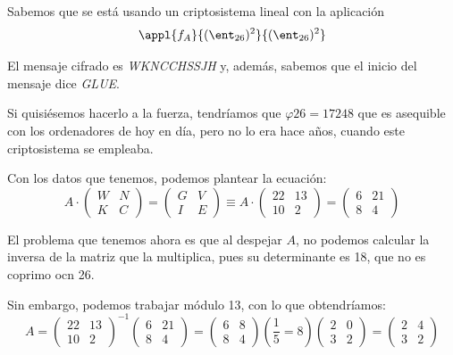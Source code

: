 \begin{example}
Sabemos que se está usando un criptosistema lineal con la aplicación
\[\appl{f_A}{(\ent_{26})^2}{(\ent_{26})^2}\]

El mensaje cifrado es \textit{WKNCCHSSJH} y, además, sabemos que el inicio del mensaje dice \textit{GLUE}.

Si quisiésemos hacerlo a la fuerza, tendríamos que $\varphi{26} = 17248$ que es asequible con los ordenadores de hoy en día, pero no lo era hace años, cuando este criptosistema se empleaba.

Con los datos que tenemos, podemos plantear la ecuación:
\[A \cdot \left( \begin{array}{cc}
W & N \\
K & C  \end{array} \right) = \left( \begin{array}{cc}
G & V \\
I & E  \end{array} \right) \equiv A \cdot \left( \begin{array}{cc}
22 & 13 \\
10 & 2  \end{array} \right) = \left( \begin{array}{cc}
6 & 21 \\
8 & 4  \end{array} \right)\]

El problema que tenemos ahora es que al despejar $A$, no podemos calcular la inversa de la matriz que la multiplica, pues su determinante es 18, que no es coprimo ocn 26.

Sin embargo, podemos trabajar módulo 13, con lo que obtendríamos:
\[  A = \left( \begin{array}{cc}
22 & 13 \\
10 & 2  \end{array} \right)^{-1} \left( \begin{array}{cc}
6 & 21 \\
8 & 4  \end{array} \right) = \left( \begin{array}{cc}
6 & 8 \\
8 & 4  \end{array} \right)\left(\frac{1}{5} = 8 \right) \left( \begin{array}{cc}
2 & 0 \\
3 & 2  \end{array} \right) = \left( \begin{array}{cc}
2 & 4 \\
3 & 2  \end{array} \right)\]


\end{example}
